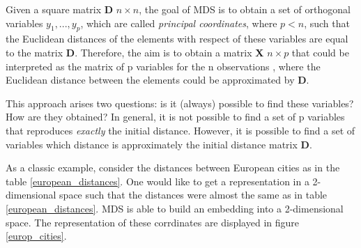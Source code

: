 \documentclass[11pt]{report}
\begin{document}
\indent Given a square matrix \textbf{D} $n\times n$, the goal of MDS is to 
obtain a set of orthogonal variables $y_1,...,y_p$, which are called 
\textit{principal coordinates}, where $p<n$, such that the Euclidean distances of
the elements with respect of these variables are equal to the matrix \textbf{D}. 
Therefore, the aim is to obtain a matrix \textbf{X} $n \times p$ that could be 
interpreted as the matrix of p variables for the n observations , where the 
Euclidean distance between the elements could be approximated by \textbf{D}.

\indent This approach arises two questions: is it (always) possible to find these
variables? How are they obtained? In general, it is not possible to find a set
of p variables that reproduces \textit{exactly} the initial distance. However, it
is possible to find a set of variables which distance is approximately the initial
distance matrix \textbf{D}.


\indent As a classic example, consider the distances between European cities as
in the table \ref{european_distances}. One would like to get a representation in
a 2-dimensional space such that the distances were almost the same as in table
\ref{european_distances}. MDS is able to build an embedding into a 2-dimensional 
space. The representation of these corrdinates are displayed in figure 
\ref{europ_cities}.
\end{document}
